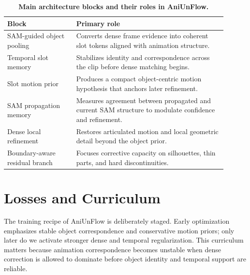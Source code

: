 \begin{table}[t]
\centering
\caption{\textbf{Main architecture blocks and their roles in AniUnFlow.}}
\label{tab:module_roles}
\renewcommand{\arraystretch}{1.12}
\begin{tabular}{p{0.29\linewidth}p{0.61\linewidth}}
\toprule
\textbf{Block} & \textbf{Primary role} \\
\midrule
SAM-guided object pooling & Converts dense frame evidence into coherent slot tokens aligned with animation structure. \\
Temporal slot memory & Stabilizes identity and correspondence across the clip before dense matching begins. \\
Slot motion prior & Produces a compact object-centric motion hypothesis that anchors later refinement. \\
SAM propagation memory & Measures agreement between propagated and current SAM structure to modulate confidence and refinement. \\
Dense local refinement & Restores articulated motion and local geometric detail beyond the object prior. \\
Boundary-aware residual branch & Focuses corrective capacity on silhouettes, thin parts, and hard discontinuities. \\
\bottomrule
\end{tabular}
\end{table}

\section{Losses and Curriculum}

The training recipe of AniUnFlow is deliberately staged. Early optimization emphasizes stable object correspondence and conservative motion priors; only later do we activate stronger dense and temporal regularization. This curriculum matters because animation correspondence becomes unstable when dense correction is allowed to dominate before object identity and temporal support are reliable.

